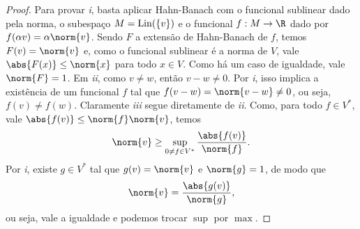 \begin{proof}
    Para provar \emph{i}, basta aplicar Hahn-Banach com o funcional sublinear dado pela norma, o subespaço \( M = \operatorname{Lin} (\left\{ v \right\}) \) e o funcional \( f : M \to \R \) dado por \( f(\alpha v) = \alpha \norm{ v } \).
    Sendo \( F \) a extensão de Hahn-Banach de \( f \), temos \( F(v) = \norm{ v } \) e, como o funcional sublinear é a norma de \( V \), vale \( \abs{ F(x) } \leq \norm{ x } \) para todo \( x \in V \).
    Como há um caso de igualdade, vale \( \norm{ F } = 1 \).
    Em \emph{ii}, como \( v \neq w \), então \( v - w \neq 0 \).
    Por \emph{i}, isso implica a existência de um funcional \( f \) tal que \( f(v - w) = \norm{ v - w } \neq 0 \), ou seja, \( f(v) \neq f(w) \).
    Claramente \emph{iii} segue diretamente de \emph{ii}.
    Como, para todo \( f \in V^{ * } \), vale \( \abs{ f(v) } \leq \norm{ f } \norm{ v } \), temos
    \begin{equation}
        \norm{ v } \geq \sup_{ 0 \neq f \in V^{ * } } \frac{ \abs{ f(v) } }{ \norm{ f } }
    .\end{equation}
    Por \emph{i}, existe \( g \in V^{ * } \) tal que \( g(v) = \norm{ v } \) e \( \norm{ g } = 1 \), de modo que
    \begin{equation}
        \norm{ v } = \frac{ \abs{ g(v) } }{ \norm{ g } }
    ,\end{equation}
    ou seja, vale a igualdade e podemos trocar \( \sup \) por \( \max \).
\end{proof}

